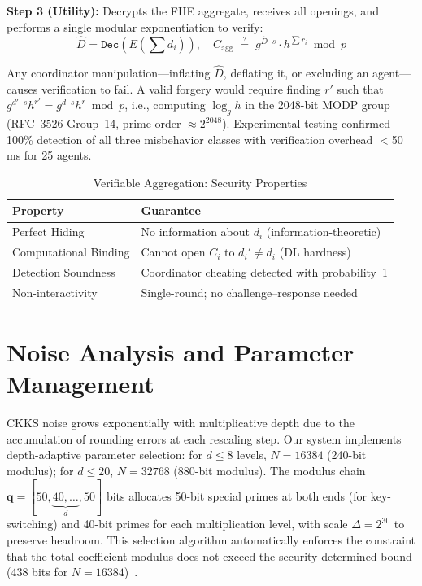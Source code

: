 \documentclass[conference]{IEEEtran}
\begin{document}
\textbf{Step 3 (Utility):} Decrypts the FHE aggregate, receives all openings, and performs a single modular exponentiation to verify:
\begin{equation}
    \hat{D} = \texttt{Dec}\!\left(E\!\left(\textstyle\sum d_i\right)\right), \quad C_\text{agg} \;\stackrel{?}{=}\; g^{\hat{D}\cdot s} \cdot h^{\sum r_i} \bmod p
\end{equation}

Any coordinator manipulation---inflating $\hat{D}$, deflating it, or excluding an agent---causes verification to fail. A valid forgery would require finding $r'$ such that $g^{d' \cdot s}h^{r'} = g^{d \cdot s}h^{r} \bmod p$, i.e., computing $\log_g h$ in the 2048-bit MODP group (RFC~3526 Group~14, prime order $\approx 2^{2048}$). Experimental testing confirmed 100\% detection of all three misbehavior classes with verification overhead $<$50\,ms for 25 agents.

\begin{table}[!t]
\centering
\caption{Verifiable Aggregation: Security Properties}
\label{tab:ver_security}
\footnotesize
\begin{tabular}{@{}lp{5.5cm}@{}}
\toprule
\textbf{Property} & \textbf{Guarantee} \\
\midrule
Perfect Hiding & No information about $d_i$ (information-theoretic) \\
Computational Binding & Cannot open $C_i$ to $d_i' \neq d_i$ (DL hardness) \\
Detection Soundness & Coordinator cheating detected with probability~1 \\
Non-interactivity & Single-round; no challenge--response needed \\
\bottomrule
\end{tabular}
\end{table}

\section{Noise Analysis and Parameter Management}
\label{sec:noise}

CKKS noise grows exponentially with multiplicative depth due to the accumulation of rounding errors at each rescaling step. Our system implements depth-adaptive parameter selection: for $d \leq 8$ levels, $N=16384$ (240-bit modulus); for $d \leq 20$, $N=32768$ (880-bit modulus). The modulus chain $\mathbf{q} = [50,\underbrace{40,\ldots}_{d},50]$ bits allocates 50-bit special primes at both ends (for key-switching) and 40-bit primes for each multiplication level, with scale $\Delta=2^{30}$ to preserve headroom. This selection algorithm automatically enforces the constraint that the total coefficient modulus does not exceed the security-determined bound (438 bits for $N=16384$)~\cite{HEStandard2018}.
\end{document}
